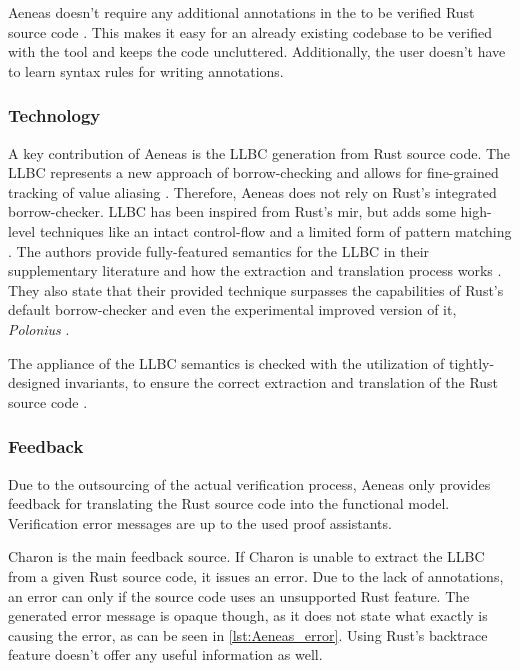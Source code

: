 Aeneas doesn't require any additional annotations in the to be verified Rust source code \cite{ho_aeneas_2022}. This makes it easy for an already existing codebase to be verified with the tool and keeps the code uncluttered. Additionally, the user doesn't have to learn syntax rules for writing annotations.

\subsubsection{Technology}

A key contribution of Aeneas is the LLBC generation from Rust source code. The LLBC represents a new approach of borrow-checking and allows for fine-grained tracking of value aliasing \cite{ho_aeneas_2022}. Therefore, Aeneas does not rely on Rust's integrated borrow-checker. LLBC has been inspired from Rust's \acs{mir}, but adds some high-level techniques like an intact control-flow and a limited form of pattern matching \cite{ho_aeneas_2022}. The authors provide fully-featured semantics for the LLBC in their supplementary literature and how the extraction and translation process works \cite{ho_aeneas_2022}. They also state that their provided technique surpasses the capabilities of Rust's default borrow-checker and even the experimental improved version of it, \textit{Polonius} \cite{polonius_what_2023} \cite{ho_aeneas_2022}.

The appliance of the LLBC semantics is checked with the utilization of tightly-designed invariants, to ensure the correct extraction and translation of the Rust source code \cite{ho_aeneas_2022}.

\subsubsection{Feedback}
Due to the outsourcing of the actual verification process, Aeneas only provides feedback for translating the Rust source code into the functional model. Verification error messages are up to the used proof assistants.

Charon is the main feedback source. If Charon is unable to extract the LLBC from a given Rust source code, it issues an error. Due to the lack of annotations, an error can only if the source code uses an unsupported Rust feature. The generated error message is opaque though, as it does not state what exactly is causing the error, as can be seen in \autoref{lst:Aeneas_error}. Using Rust's backtrace feature doesn't offer any useful information as well.

